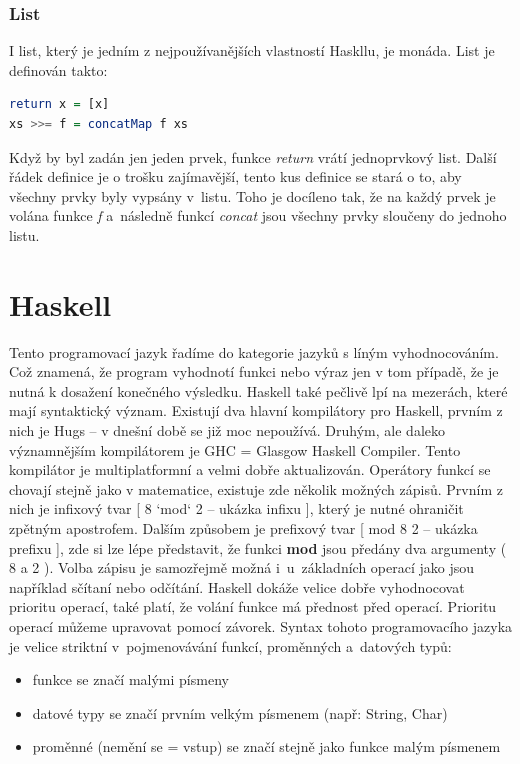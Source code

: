 \documentclass[12pt,a4paper]{report}
\begin{document}
\subsubsection{List}
I list, který je jedním z nejpoužívanějších vlastností Haskllu, je monáda. List je definován takto:
\begin{lstlisting}[language=Haskell, caption={Definice List}, captionpos=b,]
return x = [x]
xs >>= f = concatMap f xs 
\end{lstlisting}
Když by byl zadán jen jeden prvek, funkce \textit{return} vrátí jednoprvkový list. Další řádek definice je o trošku zajímavější, tento kus definice se stará o to, aby všechny prvky byly vypsány v~listu. Toho je docíleno tak, že na každý prvek je volána funkce \textit{f} a~následně funkcí \textit{concat} jsou všechny prvky sloučeny do jednoho listu.  

\section{Haskell}
Tento programovací jazyk řadíme do kategorie jazyků s líným vyhodnocováním.\cite{haskell} Což znamená, že program vyhodnotí funkci nebo výraz jen v tom případě, že je nutná k dosažení konečného výsledku. Haskell také pečlivě lpí na mezerách, které mají syntaktický význam. Existují dva hlavní kompilátory pro Haskell, prvním z nich je Hugs -- v dnešní době se již moc nepoužívá. Druhým, ale daleko významnějším kompilátorem je GHC = Glasgow Haskell Compiler. Tento kompilátor je multiplatformní a velmi dobře aktualizován. Operátory funkcí se chovají stejně jako v matematice, existuje zde několik možných zápisů. Prvním z nich je infixový tvar [ 8 `mod` 2 -- ukázka infixu ], který je nutné ohraničit zpětným apostrofem. Dalším způsobem je prefixový tvar [ mod 8 2 -- ukázka prefixu ], zde si lze lépe představit, že funkci \textbf{mod} jsou předány dva argumenty ( 8 a 2 ). Volba zápisu je samozřejmě možná i~u~základních operací jako jsou například sčítaní nebo odčítání. Haskell dokáže velice dobře vyhodnocovat prioritu operací, také platí, že volání funkce má přednost před operací. Prioritu operací můžeme upravovat pomocí závorek. Syntax tohoto programovacího jazyka je velice striktní v~pojmenovávání funkcí, proměnných a~datových typů:
\begin{itemize}
\item funkce se značí malými písmeny 
\item datové typy se značí prvním velkým písmenem (např: String, Char)
\item proměnné (nemění se = vstup) se značí stejně jako funkce malým písmenem
\end{itemize}
\end{document}
